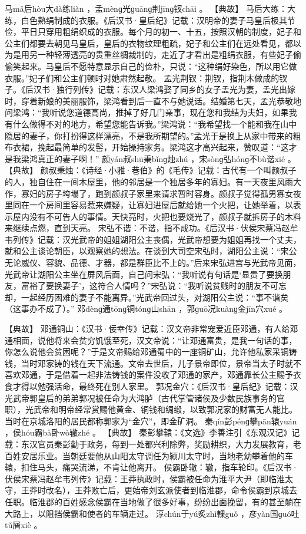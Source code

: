 \documentclass[12pt,UTF8]{ctexbook}
\begin{document}
马mǎ后hòu大dà练liàn
，孟mènɡ光ɡuānɡ荆jīnɡ钗chāi
。
【典故】
马后大练：大练，白色熟绢制成的衣服。《后汉书·皇后纪》记载：汉明帝的妻子马皇后极其节俭，平日只穿用粗绢织成的衣服。每个月的初一、十五，按照汉朝的制度，妃子和公主们都要去朝见马皇后，皇后的衣物纹理粗疏，妃子和公主们在远处看见，都以为是用另一种轻薄透亮的贵重丝绸裁制的，走近了才看出是粗绢衣服，有些妃子偷偷笑起来。马皇后不愿特意显示自己的俭朴，只说：“这种绢好染色，所以用它做衣服。”妃子们和公主们顿时对她肃然起敬。
孟光荆钗：荆钗，指荆木做成的钗子。《后汉书·独行列传》记载：东汉人梁鸿娶了同乡的女子孟光为妻，孟光出嫁时，穿着新娘的美丽服饰，梁鸿看到后一直不与她说话。结婚第七天，孟光恭敬地问梁鸿：“我听说您道德高尚，推掉了好几门亲事，现在您和我结为夫妇，如果我有什么做得不对的地方，希望您能告诉我。”梁鸿说：“我希望找一个能和我在山中隐居的妻子，你打扮得这样漂亮，不是我所期望的。”孟光于是换上从家中带来的粗布衣裙，挽起最简单的发髻，开始操持家务。梁鸿这才高兴起来，赞叹道：“这才是我梁鸿真正的妻子啊！”
颜yán叔shū秉bǐnɡ烛zhú
，宋sònɡ弘hónɡ不bù谐xié
。
【典故】
颜叔秉烛：《诗经·小雅·巷伯》的《毛传》记载：古代有一个叫颜叔子的人，独自住在一间木屋里，他的邻居是一个独居多年的寡妇。有一天夜里风雨大作，寡妇的房子垮塌了，跑到颜叔子家里来请求暂时容身。颜叔子觉得孤男寡女夜里同在一个房间里容易惹来嫌疑，让寡妇进屋后就给她一个火把，让她举着，以表示屋内没有不可告人的事情。天快亮时，火把也要烧光了，颜叔子就拆房子的木料来继续点燃，直到天亮。
宋弘不谐：不谐，指不成功。《后汉书·伏侯宋蔡冯赵牟韦列传》记载：汉光武帝的姐姐湖阳公主丧偶，光武帝想要为姐姐再找一个丈夫，就和公主谈论朝臣，以观察她的想法。在谈到大司空宋弘时，湖阳公主说：“宋公无论威仪、容貌、品德、才器，都是群臣比不上的。”后来宋弘进宫与光武帝见面，光武帝让湖阳公主坐在屏风后面，自己问宋弘：“我听说有句话是‘显贵了要换朋友，富裕了要换妻子’，这符合人情吗？”宋弘说：“我听说贫贱时的朋友不可忘却，一起经历困难的妻子不能离异。”光武帝回过头，对湖阳公主说：“事不谐矣（这事办不成了）。”
邓dènɡ通tōnɡ铜tónɡ山shān
，郭ɡuō况kuànɡ金jīn穴xué
。

【典故】
邓通铜山：《汉书·佞幸传》记载：汉文帝非常宠爱近臣邓通，有人给邓通相面，说他将来会贫穷饥饿至死，汉文帝说：“让邓通富贵，是我一句话的事，你怎么说他会贫困呢？”于是文帝赐给邓通蜀中的一座铜矿山，允许他私家采铜铸钱，当时邓家铸的钱在天下流通。文帝去世后，儿子景帝即位，景帝当太子时就不喜欢邓通，于是借着一起非法铸钱的案件没收了邓通的家产，邓通靠长公主赐予衣食才得以勉强活命，最终死在别人家里。
郭况金穴：《后汉书·皇后纪》记载：汉光武帝郭皇后的弟弟郭况被任命为大鸿胪（古代掌管诸侯及少数民族事务的官职），光武帝和明帝经常赏赐他黄金、铜钱和绸缎，以致郭况家的财富无人能比。当时在京城洛阳的居民都称郭家为“金穴”，即金矿洞。
秦qín彭pénɡ攀pān辕yuán
，侯hóu霸bà卧wò辙zhé
。
【典故】
秦彭攀辕：《文选》李善注引《东观汉记》记载：东汉官员秦彭勤于政务，每到一处都兴利除弊，奖励耕织，大力发展教育，老百姓安居乐业。当朝廷要他从山阳太守调任为颍川太守时，当地老幼攀着他的车辕，扣住马头，痛哭流涕，不肯让他离开。
侯霸卧辙：辙，指车轮印。《后汉书·伏侯宋蔡冯赵牟韦列传》记载：王莽执政时，侯霸被任命为淮平大尹（即临淮太守，王莽时改名），王莽败亡后，更始帝刘玄派使者到临淮郡，命令侯霸到京城去任职。临淮郡的百姓感念侯霸在当地做了很多好事，纷纷出面挽留，有的甚至躺在大路上，以阻挡侯霸和使者的车辆走过。
淳chún于yú炙zhì輠guǒ
，彦yàn国ɡuó吐tǔ屑xiè
。
\end{document}
